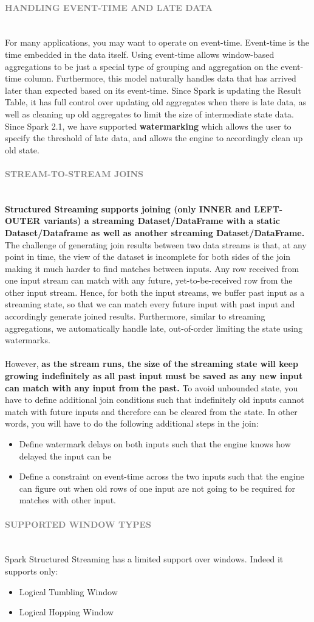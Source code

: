 \documentclass[10pt,a4paper]{article}
\newcommand{\nline}{\\~\\}
\newcommand{\myparagraph}[1]{\paragraph{\normalsize{\textcolor{gray}{\uppercase{\textbf{#1}}}} }\mbox{} \vspace{0.5em}\\}
\begin{document}
\myparagraph{Handling Event-time and Late Data}
For many applications, you may want to operate on event-time. Event-time is the time embedded in the data itself. Using event-time allows window-based aggregations to be just a special type of grouping and aggregation on the event-time column. Furthermore, this model naturally handles data that has arrived later than expected based on its event-time. Since Spark is updating the Result Table, it has full control over updating old aggregates when there is late data, as well as cleaning up old aggregates to limit the size of intermediate state data. Since Spark 2.1, we have supported \textbf{watermarking} which allows the user to specify the threshold of late data, and allows the engine to accordingly clean up old state.

\myparagraph{Stream-to-stream joins}
\textbf{Structured Streaming supports joining (only INNER and LEFT-OUTER variants) a streaming Dataset/DataFrame with a static Dataset/Dataframe as well as another streaming Dataset/DataFrame.} The challenge of generating join results between two data streams is that, at any point in time, the view of the dataset is incomplete for both sides of the join making it much harder to find matches between inputs. Any row received from one input stream can match with any future, yet-to-be-received row from the other input stream. Hence, for both the input streams, we buffer past input as a streaming state, so that we can match every future input with past input and accordingly generate joined results. Furthermore, similar to streaming aggregations, we automatically handle late, out-of-order limiting the state using watermarks.
\nline
However, \textbf{as the stream runs, the size of the streaming state will keep growing indefinitely as all past input must be saved as any new input can match with any input from the past.} To avoid unbounded state, you have to define additional join conditions such that indefinitely old inputs cannot match with future inputs and therefore can be cleared from the state. In other words, you will have to do the following additional steps in the join:
\begin{itemize}
	\item Define watermark delays on both inputs such that the engine knows how delayed the input can be
	\item Define a constraint on event-time across the two inputs such that the engine can figure out when old rows of one input are not going to be required for matches with other input.
\end{itemize}
\myparagraph{Supported Window Types}
Spark Structured Streaming has a limited support over windows. Indeed it supports only:
\begin{itemize}
	\item Logical Tumbling Window
	\item Logical Hopping Window
\end{itemize}
\end{document}
